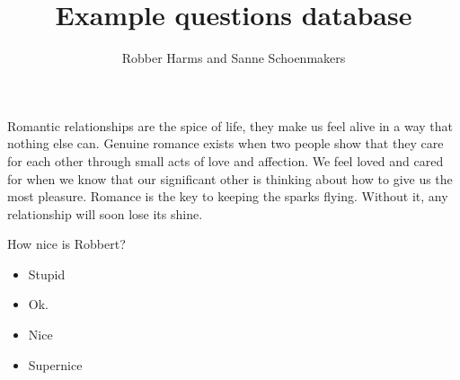 \documentclass{article}
\newenvironment{question}[2]{}{}
\newenvironment{answers}{\begin{itemize}}{\end{itemize}}
\newcommand\answerinfo[1]{}
\newcommand\metadata[1]{}
\newcommand\analytics[1]{}
\begin{document}
	
\title{Example questions database}
\author{Robber Harms and Sanne Schoenmakers}
\maketitle


\begin{question}{multiple_choice}{#2020_01}
Romantic relationships are the spice of life, they make us feel alive in a way that nothing else can. Genuine romance exists when two people show that they care for each other through small acts of love and affection. We feel loved and cared for when we know that our significant other is thinking about how to give us the most pleasure. Romance is the key to keeping the sparks flying. Without it, any relationship will soon lose its shine.

How nice is Robbert?

\begin{answers}
	\item Stupid  
		\answerinfo{points:-1}
	\item Ok.
		\answerinfo{points:0.2}
	\item Nice
	\item Supernice
		\answerinfo{correct,points:1}
\end{answers}

\metadata{
	thinking_type: knowledge
	related_concepts: [Brains, Body, Behaviour]
	chapter: 1
	difficulty: 10
}

\analytics{
- 2020_qz1: 
	participants: 1
	nmr_correct: 0
- 2020_qz1:
	participants: 200
	nmr_correct: 25
}
\end{question}


	
\end{document}
